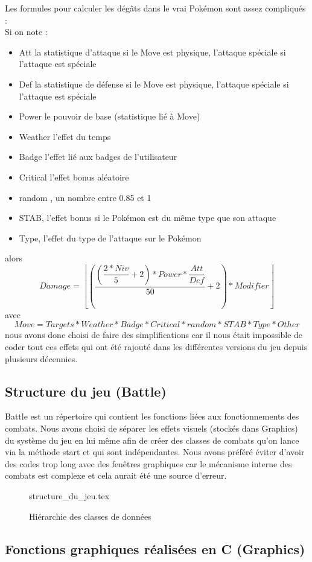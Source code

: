 \documentclass[a4paper,twoside, openany,11pt]{book}
\newcommand{\Floor}[1]{\left\lfloor #1 \right\rfloor}
\begin{document}
Les formules pour calculer les dégâts dans le vrai Pokémon sont assez compliqués :\\
Si on note :
\begin{itemize}
\item Att la statistique d'attaque si le Move est physique, l'attaque spéciale si l'attaque est spéciale
\item Def la statistique de défense si le Move est physique, l'attaque spéciale si l'attaque est spéciale
\item Power le pouvoir de base (statistique lié à Move)
\item Weather l'effet du temps
\item Badge l'effet lié aux badges de l'utilisateur
\item Critical l'effet bonus aléatoire 
\item random , un nombre entre 0.85 et 1
\item STAB, l'effet bonus si le Pokémon est du même type que son attaque
\item Type, l'effet du type de l'attaque sur le Pokémon
\end{itemize}
alors 
\[
Damage = \Floor{\left(\dfrac{\left(\dfrac{2 * Niv}{5} + 2\right) * Power * \dfrac{Att}{Def}}{50} + 2 \right) * Modifier}
\]
avec
\[
Move = Targets * Weather * Badge * Critical * random * STAB * Type * Other
\]
nous avons donc choisi de faire des simplifications car il nous était impossible de coder tout ces effets qui ont été rajouté dans les différentes versions du jeu depuis plusieurs décennies.


\subsection{Structure du jeu (Battle)}
Battle est un répertoire qui contient les fonctions liées aux fonctionnements des combats. Nous avons choisi de séparer les effets visuels (stockés dans Graphics) du système du jeu en lui même afin de créer des classes de combats qu'on lance via la méthode start et qui sont indépendantes. Nous avons préféré éviter d'avoir des codes trop long avec des fenêtres graphiques car le mécanisme interne des combats est complexe et cela aurait été une source d'erreur.

\begin{figure}[!h]\centering
{structure_du_jeu.tex}
\caption{Hiérarchie des classes de données}
\end{figure}

\subsection{Fonctions graphiques réalisées en C (Graphics)}
\end{document}
